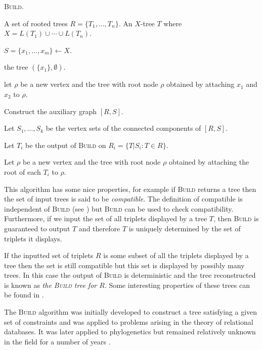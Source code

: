 \begin{algorithm}
  \caption{\textsc{Build}.}
  \label{alg:build}

  \begin{algorithmic}
    \Require A set of rooted trees $R = \{T_1,\dotsc,T_n\}$.
    \Ensure  An $X$-tree $T$ where $X = L(T_1) \cup \dotsb \cup L(T_n)$.

    \State $S = \{x_1,\dotsc,x_m\} \gets X$.

     \Return the tree $(\{x_1\},\emptyset)$. \EndIf

     let $\rho$ be a new vertex and \Return the tree with root
    node $\rho$ obtained by attaching $x_1$ and $x_2$ to $\rho$. \EndIf

    \State Construct the auxiliary graph $[R,S]$.

    \State Let $S_1,\dotsc,S_k$ be the vertex sets of the connected components
    of $[R,S]$.

    \State Let $T_i$ be the output of \textsc{Build} on $R_i =
    \{T|S_i \colon T \in R\}$.
    \EndFor

    \State Let $\rho$ be a new vertex and \Return the tree with root node
    $\rho$ obtained by attaching the root of each $T_i$ to $\rho$.
    
  \end{algorithmic}
\end{algorithm}

This algorithm has some nice properties, for example if \textsc{Build} returns
a tree then the set of input trees is said to be \textit{compatible}.  The
definition of compatible is independent of \textsc{Build} (see
\cite{semple2003phylogenetics}) but \textsc{Build} can be used to check
compatibility.  Furthermore, if we input the set of all triplets displayed by
a tree $T$, then \textsc{Build} is guaranteed to output $T$ and therefore $T$
is uniquely determined by the set of triplets it displays.

If the inputted set of triplets $R$ is some subset of all the triplets
displayed by a tree then the set is still compatible but this set is displayed
by possibly many trees.  In this case the output of \textsc{Build} is
deterministic and the tree reconstructed is known as \textit{the
  \textsc{Build} tree for $R$}.  Some interesting properties of these trees
can be found in \cite[Section 2.5.2]{bryant97buildingtrees}.

The \textsc{Build} algorithm was initially developed to construct a tree
satisfying a given set of constraints and was applied to problems arising in
the theory of relational databases.  It was later applied to phylogenetics but
remained relatively unknown in the field for a number of years
\cite{steel1992complexity,bryant04supertree}.

